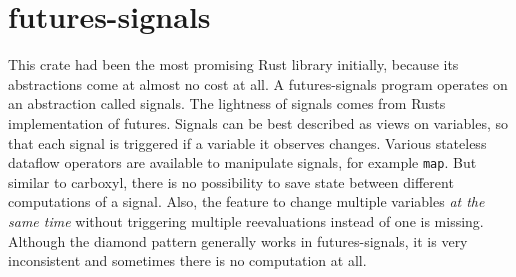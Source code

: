 \section{futures-signals}
\label{related:futures-signals}
This crate had been the most promising Rust library initially, because its abstractions come at almost no cost at all. A \textsf{futures-signals} program operates on an abstraction called signals. The lightness of signals comes from Rusts implementation of futures. Signals can be best described as views on variables, so that each signal is triggered if a variable it observes changes. Various stateless dataflow operators are available to manipulate signals, for example \texttt{map}. But similar to \textsf{carboxyl}, there is no possibility to save state between different computations of a signal. Also, the feature to change multiple variables \emph{at the same time} without triggering multiple reevaluations instead of one is missing. Although the diamond pattern generally works in \textsf{futures-signals}, it is very inconsistent and sometimes there is no computation at all.